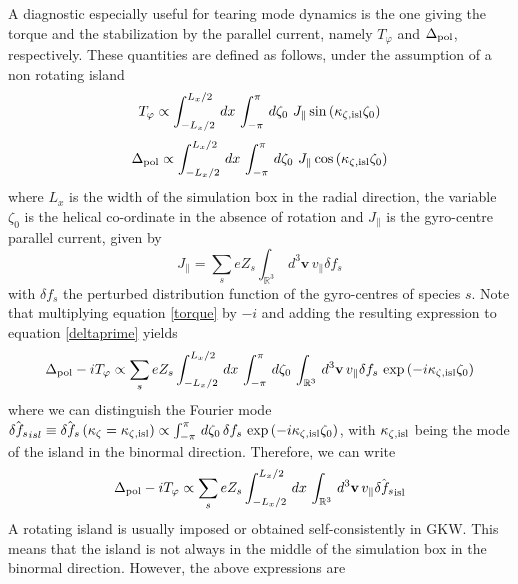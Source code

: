 A diagnostic especially useful for tearing mode dynamics is the one giving the torque and the stabilization
 by the parallel current, namely $T_\varphi$ and $\Delta_{\rm pol}$, respectively. These quantities are defined as follows, under
the assumption of a non rotating island
\begin{equation}
T_\varphi \propto \int_{-L_x/2}^{L_x/2}\, dx\, \int_{-\pi}^{\pi}\, d\zeta_0\,\,J_\parallel\sin\left(\kappa_{\zeta,\rm isl}\zeta_0\right)
\label{torque}
\end{equation}
\begin{equation}
\Delta_{\rm pol} \propto \int_{-L_x/2}^{L_x/2}\, dx\, \int_{-\pi}^{\pi}\, d\zeta_0\,\,J_\parallel\cos\left(\kappa_{\zeta,\rm isl}\zeta_0\right)
\label{deltaprime}
\end{equation}
where $L_x$ is the width of the simulation box in the radial direction, the variable $\zeta_0$ is the
helical co-ordinate in the absence of rotation and $J_\parallel$ is the gyro-centre parallel
current, given by
\begin{equation}
J_\parallel = \sum_{s}eZ_s\int_{\mathbb{R}^3} \, d^3\mathbf{v}\, v_\parallel \delta f_s
\end{equation}
with $\delta f_s$ the perturbed distribution function of the gyro-centres of species $s$.
Note that multiplying equation \ref{torque} by $-i$
and adding the resulting expression to equation \ref{deltaprime} yields
\begin{equation}
\Delta_{\rm pol} - i T_\varphi \propto \sum_{s}eZ_s\int_{-L_x/2}^{L_x/2}\, dx\, \int_{-\pi}^{\pi}\, d\zeta_0\, \int_{\mathbb{R}^3} \, d^3\mathbf{v} \, v_\parallel \delta f_s\, \exp\left(-i\kappa_{\zeta,\rm isl}\zeta_0\right)
\end{equation}
where we can distinguish the Fourier mode $\hat{\delta f_s}_{isl}\equiv\hat{\delta
f_s}\left(\kappa_\zeta=\kappa_{\zeta,\rm isl}\right)\propto\int_{-\pi}^{\pi}\, d\zeta_0\, \delta f_s \, \exp\left(-i\kappa_{\zeta,\rm isl}\zeta_0\right)$, with $\kappa_{\zeta,\rm isl}$ being the mode
 of the island in the binormal direction. Therefore, we can write
\begin{equation}
\Delta_{\rm pol} - i T_\varphi \propto \sum_{s}eZ_s\int_{-L_x/2}^{L_x/2}\, dx\, \int_{\mathbb{R}^3} \, d^3\mathbf{v} \, v_\parallel \hat{\delta f_s}_{\rm isl}
\end{equation}
A rotating island is usually imposed or obtained self-consistently in GKW. This means that the island is not
 always in the middle of the simulation box in the binormal direction. However, the above expressions are
